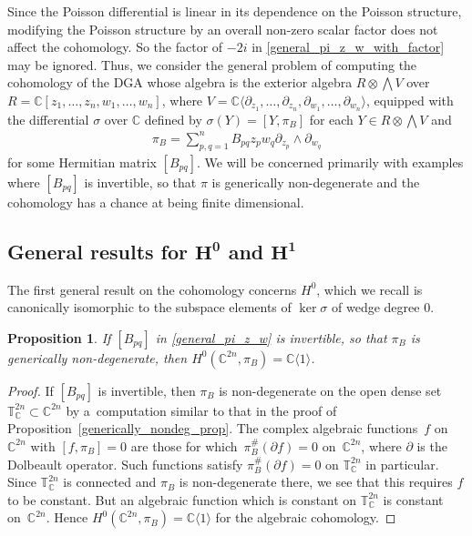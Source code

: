 \documentclass[pdftex]{sigma}
\numberwithin{equation}{section}
\newtheorem{Proposition}[Theorem]{Proposition}
 { \theoremstyle{definition}
\newtheorem{Definition}[Theorem]{Definition}
\newtheorem{Note}[Theorem]{Note}
\newtheorem{Example}[Theorem]{Example}
\newtheorem{Remark}[Theorem]{Remark} }
\begin{document}
Since the Poisson dif\/ferential is linear in its dependence on the Poisson structure, modifying the Poisson structure by an overall non-zero scalar factor does not af\/fect the coho\-mo\-logy. So the factor of $-2i$ in \eqref{general_pi_z_w_with_factor} may be ignored. Thus, we consider the general problem of computing the cohomology of the DGA whose algebra is the exterior algebra $R\otimes\bigwedge V$ over $R={\mathbb C}[z_1,\dots,z_n,w_1,\dots,w_n]$, where $V={\mathbb C}\langle\partial_{z_1},\dots,\partial_{z_n},\partial_{w_1},\dots,\partial_{w_n}\rangle$, equipped with the dif\/ferential $\sigma$ over ${\mathbb C}$ def\/ined by $\sigma(Y)=[Y,\pi_B]$ for each $Y\in R\otimes\bigwedge V$ and
\begin{gather}\label{general_pi_z_w}
\pi_B=\sum_{p,q=1}^n B_{pq} z_pw_q\partial_{z_p}\wedge\partial_{w_q}
\end{gather}
for some Hermitian matrix $[B_{pq}]$. We will be concerned primarily with examples where $[B_{pq}]$ is invertible, so that $\pi$ is generically non-degenerate and the cohomology has a chance at being f\/inite dimensional.

\subsection[General results for $H^{0}$ and $H^{1}$]{General results for $\boldsymbol{H^{0}}$ and $\boldsymbol{H^{1}}$}

The f\/irst general result on the cohomology concerns $H^0$, which we recall is canonically isomorphic to the subspace elements of $\ker\sigma$ of wedge degree $0$.

\begin{Proposition}\label{H0_prop}
If $[B_{pq}]$ in \eqref{general_pi_z_w} is invertible, so that $\pi_B$ is generically non-degenerate, then $H^0({\mathbb C}^{2n},\pi_B)={\mathbb C}\langle 1\rangle$.
\end{Proposition}
\begin{proof}
If $[B_{pq}]$ is invertible, then $\pi_B$ is non-degenerate on the open dense set ${\mathbb T}_{\mathbb C}^{2n}\subset{\mathbb C}^{2n}$ by a~computation similar to that in the proof of Proposition~\ref{generically_nondeg_prop}. The complex algebraic functions~$f$ on~${\mathbb C}^{2n}$ with $[f,\pi_B]=0$ are those for which~$\pi_B^\#(\partial f)=0$ on~${\mathbb C}^{2n}$, where $\partial$ is the Dolbeault operator. Such functions satisfy $\pi_B^\#(\partial f)=0$ on ${\mathbb T}_{\mathbb C}^{2n}$ in particular. Since ${\mathbb T}_{\mathbb C}^{2n}$ is connected and $\pi_B$ is non-degenerate there, we see that this requires $f$ to be constant. But an algebraic function which is constant on ${\mathbb T}_{\mathbb C}^{2n}$ is constant on~${\mathbb C}^{2n}$. Hence $H^0({\mathbb C}^{2n},\pi_B)={\mathbb C}\langle 1\rangle$ for the algebraic cohomology.
\end{proof}
\end{document}
